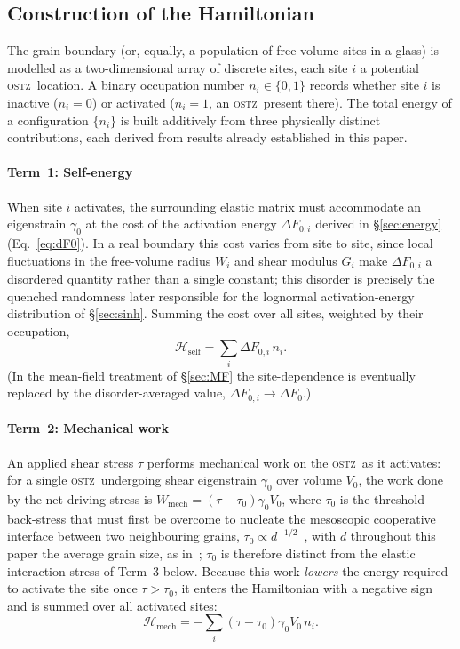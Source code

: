 \documentclass[3p]{elsarticle}
\newcommand{\OSTZ}{\textsc{ostz}}
\newcommand{\dF}{\Delta F_0}
\newcommand{\gz}{\gamma_0}
\begin{document}
\subsection{Construction of the Hamiltonian}
\label{sec:Hamiltonian}

The grain boundary (or, equally, a population of free-volume sites
in a glass) is modelled as a two-dimensional array of discrete
sites, each site $i$ a potential \OSTZ\ location. A binary occupation
number $n_i\in\{0,1\}$ records whether site $i$ is inactive ($n_i=0$)
or activated ($n_i=1$, an \OSTZ\ present there). The total energy of
a configuration $\{n_i\}$ is built additively from three physically
distinct contributions, each derived from results already established
in this paper.

\paragraph{Term~1: Self-energy}
When site $i$ activates, the surrounding elastic matrix must
accommodate an eigenstrain $\gz$ at the cost of the activation
energy $\Delta F_{0,i}$ derived in \S\ref{sec:energy}
(Eq.~\eqref{eq:dF0}). In a real boundary this cost varies from site
to site, since local fluctuations in the free-volume radius $W_i$ and
shear modulus $G_i$ make $\Delta F_{0,i}$ a disordered quantity rather
than a single constant; this disorder is precisely the quenched
randomness later responsible for the lognormal activation-energy
distribution of \S\ref{sec:sinh}. Summing the cost over all sites,
weighted by their occupation,
\begin{equation}
  \mathcal H_\text{self}=\sum_i\Delta F_{0,i}\,n_i.
  \label{eq:Hself}
\end{equation}
(In the mean-field treatment of \S\ref{sec:MF} the site-dependence is
eventually replaced by the disorder-averaged value, $\Delta
F_{0,i}\to\dF$.)

\paragraph{Term~2: Mechanical work}
An applied shear stress $\tau$ performs mechanical work on the
\OSTZ\ as it activates: for a single \OSTZ\ undergoing shear
eigenstrain $\gz$ over volume $V_0$, the work done by the net driving
stress is $W_\mathrm{mech}=(\tau-\tau_0)\gz V_0$, where $\tau_0$ is
the threshold back-stress that must first be overcome to nucleate
the mesoscopic cooperative interface between two neighbouring grains,
$\tau_0\propto d^{-1/2}$~\citep{pad-part1}, with $d$ throughout this
paper the average grain size, as in~\citep{pad-part1}; $\tau_0$ is therefore
distinct from the elastic interaction stress of Term~3 below. Because
this work \emph{lowers} the energy required to activate the site once
$\tau>\tau_0$, it enters the Hamiltonian with a negative sign and is
summed over all activated sites:
\begin{equation}
  \mathcal H_\text{mech}=-\sum_i(\tau-\tau_0)\gz V_0\,n_i.
  \label{eq:Hmech}
\end{equation}
\end{document}
